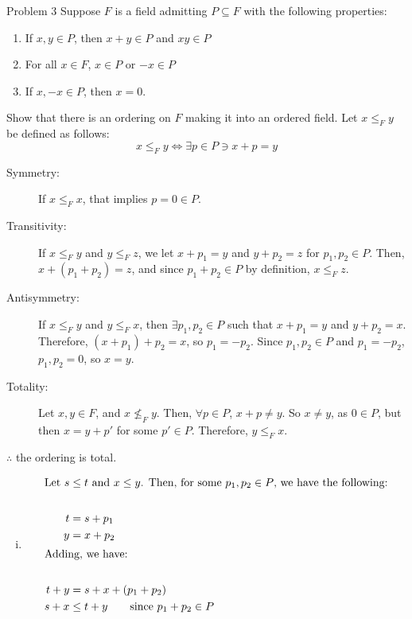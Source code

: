 \documentclass[10pt]{extarticle}
\begin{document}
  \begin{problem}{Problem 3}
    Suppose $F$ is a field admitting $P\subseteq F$ with the following properties:
    \begin{enumerate}[(C1)]
      \item If $x,y\in P$, then $x+y\in P$ and $xy\in P$
      \item For all $x\in F$, $x\in P$ or $-x\in P$
      \item If $x,-x\in P$, then $x = 0$.
    \end{enumerate}
    Show that there is an ordering on $F$ making it into an ordered field.
    \tcblower
    Let $x\leq_F y$ be defined as follows:
    \[
      x\leq_F y \Leftrightarrow \exists p\in P \ni x+p = y
    \] 
    \begin{description}
      \item[Symmetry:] If $x\leq_F x$, that implies $p = 0\in P$.
      \item[Transitivity:] If $x\leq_F y$ and $y\leq_F z$, we let $x+p_1 = y$ and $y+p_2 = z$ for $p_1,p_2\in P$. Then, $x + (p_1 + p_2) = z$, and since $p_1 + p_2\in P$ by definition, $x\leq_F z$.
      \item[Antisymmetry:] If $x \leq_F y$ and $y\leq_F x$, then $\exists p_1,p_2\in P$ such that $x+p_1 = y$ and $y + p_2 = x$. Therefore, $(x+p_1) + p_2 = x$, so $p_1 = -p_2$. Since $p_1,p_2\in P$ and $p_1 = -p_2$, $p_1,p_2 = 0$, so $x = y$.
      \item[Totality:] Let $x,y\in F$, and $x\not\leq_F y$. Then, $\forall p\in P$, $x + p \neq y$. So $x\neq y$, as $0\in P$, but then $x = y + p'$ for some $p'\in P$. Therefore, $y\leq_F x$.
    \end{description}
    $\therefore$ the ordering is total.
    \begin{enumerate}[(i)]
      \item 
        \begin{align*}
          \shortintertext{Let $s\leq t$ and $x\leq y$. Then, for some $p_1,p_2\in P$, we have the following:}\\
          t &= s + p_1\\
          y &= x + p_2\\
          \shortintertext{Adding, we have:}\\
          t + y &= s + x + (p_1 + p_2)\\
          s+x &\leq t+y \tag*{since $p_1 + p_2\in P$}
        \end{align*}
    \end{enumerate}
  \end{problem}
\end{document}
